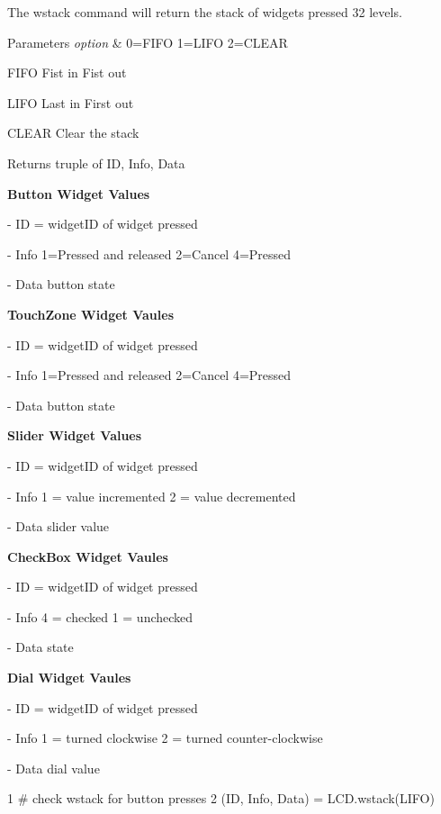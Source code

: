 The wstack command will return the stack of widgets pressed 32 levels. 


\begin{DoxyParams}{Parameters}
{\em option} & 0=F\-I\-F\-O 1=L\-I\-F\-O 2=C\-L\-E\-A\-R \par
 F\-I\-F\-O Fist in Fist out \par
 L\-I\-F\-O Last in First out \par
 C\-L\-E\-A\-R Clear the stack \\
\hline
\end{DoxyParams}
\begin{DoxyReturn}{Returns}
truple of I\-D, Info, Data \par
\par
{\bfseries  Button Widget Values } \par
 -\/ I\-D = widget\-I\-D of widget pressed \par
 -\/ Info 1=Pressed and released 2=Cancel 4=Pressed \par
 -\/ Data button state \par
\par
{\bfseries  Touch\-Zone Widget Vaules } \par
 -\/ I\-D = widget\-I\-D of widget pressed \par
 -\/ Info 1=Pressed and released 2=Cancel 4=Pressed \par
 -\/ Data button state \par
\par
{\bfseries  Slider Widget Values } \par
 -\/ I\-D = widget\-I\-D of widget pressed \par
 -\/ Info 1 = value incremented 2 = value decremented \par
 -\/ Data slider value \par
\par
{\bfseries  Check\-Box Widget Vaules } \par
 -\/ I\-D = widget\-I\-D of widget pressed \par
 -\/ Info 4 = checked 1 = unchecked \par
 -\/ Data state \par
\par
{\bfseries  Dial Widget Vaules } \par
 -\/ I\-D = widget\-I\-D of widget pressed \par
 -\/ Info 1 = turned clockwise 2 = turned counter-\/clockwise \par
 -\/ Data dial value 
\begin{DoxyCode}
1 \textcolor{comment}{# check wstack for button presses}
2 (ID, Info, Data) = LCD.wstack(LIFO)
\end{DoxyCode}
 
\end{DoxyReturn}
